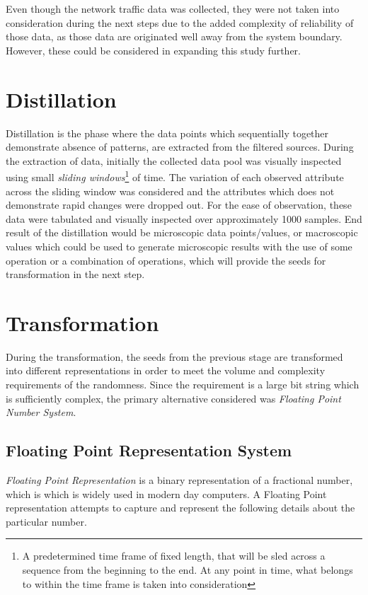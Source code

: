 Even though the network traffic data was collected, they were not taken into consideration during the next steps due to the added complexity of reliability of those data, as those data are originated well away from the system boundary. However, these could be considered in expanding this study further.

\section{Distillation}

Distillation is the phase where the data points which sequentially together demonstrate absence of patterns, are extracted from the filtered sources. During the extraction of data, initially the collected data pool was visually inspected using small \textit{sliding windows}\footnote{A predetermined time frame of fixed length, that will be sled across a sequence from the beginning to the end. At any point in time, what belongs to within the time frame is taken into consideration} of time. The variation of each observed attribute across the sliding window was considered and the attributes which does not demonstrate rapid changes were dropped out. For the ease of observation, these data were tabulated and visually inspected over approximately 1000 samples. End result of the distillation would be microscopic data points/values, or macroscopic values which could be used to generate microscopic results with the use of  some operation or a combination of operations,  which will provide the seeds for transformation in the next step.

\section{Transformation}

During the transformation, the seeds from the previous stage are transformed into different representations in order to meet the volume and complexity requirements of the randomness. Since the requirement is a large bit string which is sufficiently complex, the primary alternative considered was \textit{Floating Point Number System}.

\subsection{Floating Point Representation System}
\textit{Floating Point Representation} is a binary representation of a fractional number, which is which is widely used in modern day computers. A Floating Point representation attempts to capture and represent the following details about the particular number.

